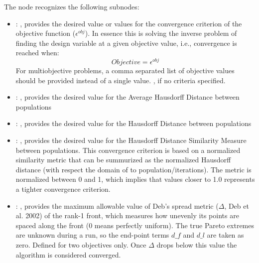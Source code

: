 \begin{itemize}
      The  node recognizes the following subnodes:
      \begin{itemize}
        \item {}: ,
          provides the desired value or values for the convergence criterion of the objective
          function                        ($\epsilon^{obj}$). In essence this is solving the inverse
          problem of finding the design variable                         at a given objective value,
          i.e., convergence is reached when: $$ Objective = \epsilon^{obj}$$
          For multiobjective problems, a comma separated list of objective
          values should be provided instead of a single value.
          , if no criteria specified.

        \item {}: ,
          provides the desired value for the Average Hausdorff Distance between populations

        \item {}: ,
          provides the desired value for the Hausdorff Distance between populations

        \item {}: ,
          provides the desired value for the Hausdorff Distance Similarity Measure between
          populations.                                     This convergence criterion is based on a
          normalized                                     similarity metric that can be summurized as
          the normalized Hausdorff distance                                     (with respect the
          domain of to population/iterations). The metric is normalized between 0 and 1,
          which implies that values closer to 1.0 represents a tighter convergence criterion.

        \item {}: ,
          provides the maximum allowable value of Deb's spread metric ($\Delta$, Deb et al. 2002) of
          the                        rank-1 front, which measures how unevenly its points are spaced
          along the front (0 means                        perfectly uniform). The true Pareto
          extremes are unknown during a run, so the end-point                        terms $d\_f$ and
          $d\_l$ are taken as zero. Defined for two objectives only. Once $\Delta$
          drops below this value the algorithm is considered converged. 


\end{itemize}
\end{itemize}
